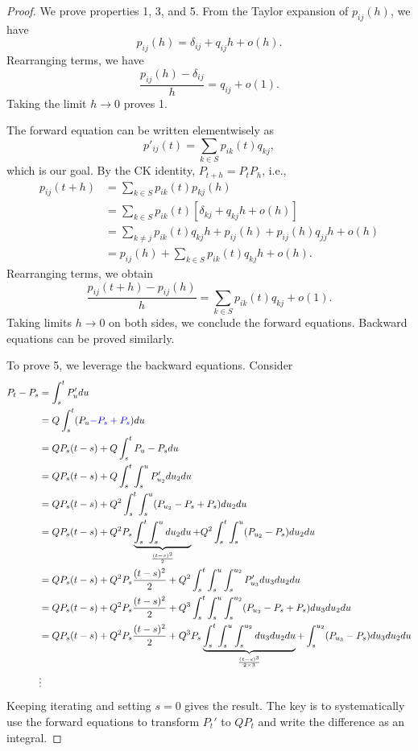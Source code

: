 \documentclass[11pt,twoside]{article}
\begin{document}
\begin{proof}
    We prove properties 1, 3, and 5. From the Taylor expansion of $p_{ij}(h)$, we have 
    \[
    p_{ij}(h) = \delta_{ij} + q_{ij}h + {o(h)}.
    \]
    Rearranging terms, we have 
    \[
    \frac{p_{ij}(h)  - \delta_{ij}}{h} = q_{ij} + {o(1)}.
    \]
    Taking the limit $h \to 0$ proves 1.

    The forward equation can be written elementwisely as 
    \[
    p'_{ij}(t) = \sum_{k \in S}p_{ik}(t) q_{kj},
    \]
    which is our goal.
    By the CK identity, $P_{t+h} = P_t P_h$, i.e., 
    \begin{align*}
        p_{ij}(t+h) &= \sum_{k \in S}p_{ik}(t)p_{kj}(h) \\
        & = \sum_{k \in S}p_{ik}(t)[\delta_{kj} + q_{kj}h + {o(h)}] \\
        &= \sum_{k \neq j}p_{ik}(t)q_{kj}h  + p_{ij}(h) +  p_{ij}(h)q_{jj}h + {o(h)} \\
        &= p_{ij}(h) + \sum_{k \in S}p_{ik}(t)q_{kj}h + o(h).
    \end{align*}
    Rearranging terms, we obtain
    \[
    \frac{p_{ij}(t+h)-p_{ij}(h)}{h} = \sum_{k \in S}p_{ik}(t)q_{kj} + o(1).
    \]
    Taking limits $h \to 0$ on both sides, we conclude the forward equations. Backward equations can be proved similarly.

    To prove 5, we leverage the backward equations. Consider
    \begin{align*}  
        P_t - P_s &= \int_s^t P_u'du \\
        &= Q\int_s^t (P_u\textcolor{blue}{-P_{s}+ P_{s}})du \\
        &= QP_{s}(t-s) + Q\int_s^t P_u-P_{s}du \\
        &= QP_{s}(t-s) + Q\int_s^t \int_s^{u} P'_{u_2}d{u_2}du \\
        &= QP_{s}(t-s) + Q^2\int_s^t \int_s^{u} (P_{u_2} -P_{s}+P_{s})d{u_2}du \\
        &= QP_{s}(t-s) + Q^2P_{s}\underbrace{\int_s^t \int_s^{u} d{u_2}du}_{\frac{(t-s)^2}{2}}+ Q^2\int_s^t \int_s^{u} (P_{u_2} -P_{s})d{u_2}du \\
        &= QP_{s}(t-s) + Q^2P_{s}\frac{(t-s)^2}{2}+ Q^2\int_s^t \int_s^{u} \int_s^{u_2} P'_{u_3}d{u_3}d{u_2}du \\
        &= QP_{s}(t-s) + Q^2P_{s}\frac{(t-s)^2}{2}+ Q^3\int_s^t \int_s^{u} \int_s^{u_2} (P_{u_3}-P_s+P_s)d{u_3}d{u_2}du \\
        &= QP_{s}(t-s) + Q^2P_{s}\frac{(t-s)^2}{2}+ Q^3P_s\underbrace{\int_s^t \int_s^{u} \int_s^{u_2} d{u_3}d{u_2}du}_{\frac{(t-s)^3}{2\times 3}} + \int_s^{u_2} (P_{u_3}-P_s)d{u_3}d{u_2}du \\
        &\vdots
    \end{align*}
    Keeping iterating and setting $s=0$ gives the result. The key is to systematically use the forward equations to transform $P_t'$ to $QP_t$ and write the difference as an integral.
\end{proof}
\end{document}
